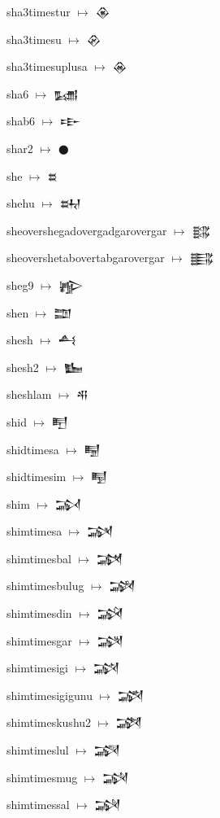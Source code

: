 {\noindent sha3timestur $\mapsto$ {\cufont 𒊴}\par
\noindent sha3timesu $\mapsto$ {\cufont 𒊵}\par
\noindent sha3timesuplusa $\mapsto$ {\cufont 𒊶}\par
\noindent sha6 $\mapsto$ {\cufont 𒊷}\par
\noindent shab6 $\mapsto$ {\cufont 𒊸}\par
\noindent shar2 $\mapsto$ {\cufont 𒊹}\par
\noindent she $\mapsto$ {\cufont 𒊺}\par
\noindent shehu $\mapsto$ {\cufont 𒊻}\par
\noindent sheovershegadovergadgarovergar $\mapsto$ {\cufont 𒊼}\par
\noindent sheovershetabovertabgarovergar $\mapsto$ {\cufont 𒊽}\par
\noindent sheg9 $\mapsto$ {\cufont 𒊾}\par
\noindent shen $\mapsto$ {\cufont 𒊿}\par
\noindent shesh $\mapsto$ {\cufont 𒋀}\par
\noindent shesh2 $\mapsto$ {\cufont 𒋁}\par
\noindent sheshlam $\mapsto$ {\cufont 𒋂}\par
\noindent shid $\mapsto$ {\cufont 𒋃}\par
\noindent shidtimesa $\mapsto$ {\cufont 𒋄}\par
\noindent shidtimesim $\mapsto$ {\cufont 𒋅}\par
\noindent shim $\mapsto$ {\cufont 𒋆}\par
\noindent shimtimesa $\mapsto$ {\cufont 𒋇}\par
\noindent shimtimesbal $\mapsto$ {\cufont 𒋈}\par
\noindent shimtimesbulug $\mapsto$ {\cufont 𒋉}\par
\noindent shimtimesdin $\mapsto$ {\cufont 𒋊}\par
\noindent shimtimesgar $\mapsto$ {\cufont 𒋋}\par
\noindent shimtimesigi $\mapsto$ {\cufont 𒋌}\par
\noindent shimtimesigigunu $\mapsto$ {\cufont 𒋍}\par
\noindent shimtimeskushu2 $\mapsto$ {\cufont 𒋎}\par
\noindent shimtimeslul $\mapsto$ {\cufont 𒋏}\par
\noindent shimtimesmug $\mapsto$ {\cufont 𒋐}\par
\noindent shimtimessal $\mapsto$ {\cufont 𒋑}\par
}
